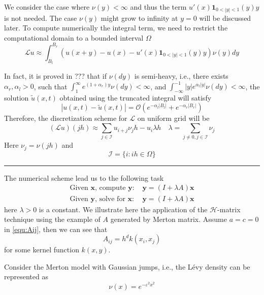 \documentclass[10pt,a4paper]{article}
\newcommand{\bx}[0]{\mathbf{x}}
\theoremstyle{definition}
\newcommand{\by}[0]{\mathbf{y}}
\begin{document}
We consider the case where $\nu(y)<\infty$ and thus the term $u'(x)\mathbf{1}_{0<|y|<1}(y)y$ is not needed. The case $\nu(y)$ might grow to infinity at $y=0$ will be discussed later. To compute numerically the integral term, we need to restrict the computational domain to a bounded interval $\Omega$
\begin{equation}
	\mathcal{L}u \approx \int_{B_l}^{B_r} (u(x+y)-u(x)-u'(x)\mathbf{1}_{0<|y|<1}(y)y)\nu(y)dy
\end{equation}

In fact, it is proved in ??? that if $\nu(dy)$ is semi-heavy, i.e., there exists $\alpha_r,\alpha_l>0$, such that $\int_1^\infty e^{(1+\alpha_r)y}\nu(dy)<\infty$, and $\int_{-\infty}^{-1}|y|e^{\alpha_l|y|}\nu(dy)<\infty$, the solution $\tilde u(x,t)$ obtained using the truncated integral will satisfy
\begin{equation}
	|u( x,t)-\tilde u(x,t)| =\mathcal{O}(e^{-\alpha_l|B_l|}+e^{-\alpha_r|B_r|})
\end{equation}
Therefore, the discretization scheme for $\mathcal{L}$ on uniform grid will be
\begin{equation}
	(\mathcal{L} u)(jh) \approx   \sum_{j\in \mathcal{I}} u_{i+j}\nu_j h - u_i \lambda h\quad \lambda = \sum_{j\neq 0, j\in \mathcal{I}} \nu_j
\end{equation}
Here $\nu_j=\nu(jh)$ and 
\begin{equation}
	\mathcal{I} = \{i: ih\in \Omega\}
\end{equation}

 
 \hrule
 
 The numerical scheme lead us to the following task
 \begin{align}
 	\mbox{Given $\bx$, compute $\by$: }&\by = (I+\lambda A)\bx\\
 	\mbox{Given $\by$, solve for $\bx$: }&\by = (I+\lambda A)\bx
 \end{align}
 here $\lambda>0$ is a constant. We illustrate here the application of the $\mathcal{H}$-matrix technique using the example of $A$ generated by Merton matrix. Assume $a=c=0$ in \cref{equ:Aij}, then we can see that
 \begin{equation}
 	A_{ij} = h^d k(x_i, x_j)
 \end{equation}
 for some kernel function $k(x,y)$. 
 
Consider the Merton model with Gaussian jumps, i.e., the L\'evy density can be represented as
\begin{equation}
	\nu(x) = e^{-\varepsilon^2 x^2}
\end{equation}
\end{document}
